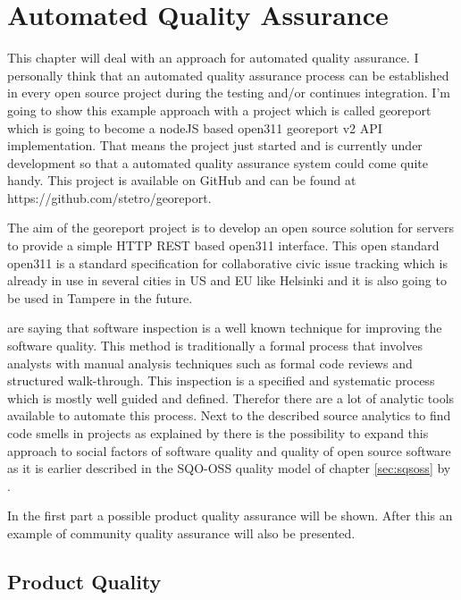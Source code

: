 \documentclass[DIV=calc,paper=a4,fontsize=9pt,twocolumn]{scrartcl}
\begin{document}
\section{Automated Quality Assurance}\label{sec:automated-quality-assurance}

This chapter will deal with an approach for automated quality assurance. I personally think that an automated quality assurance process can be established in every open source project during the testing and/or continues integration. I'm going to show this example approach with a project which is called georeport which is going to become a nodeJS based open311 georeport v2 API implementation. That means the project just started and is currently under development so that a automated quality assurance system could come quite handy. This project is available on GitHub and can be found at https://github.com/stetro/georeport.

The aim of the georeport project is to develop an open source solution for servers to provide a simple HTTP REST based open311 interface. This open standard open311 is a standard specification for collaborative civic issue tracking which is already in use in several cities in US and EU like Helsinki and it is also going to be used in Tampere in the future. \citep{open311}

\citet{van2002java} are saying that software inspection is a well known technique for improving the software quality. This method is traditionally a formal process that involves analysts with manual analysis techniques such as formal code reviews and structured walk-through. This inspection is a specified and systematic process which is mostly well guided and defined. Therefor there are a lot of analytic tools available to automate this process. Next to the described source analytics to find code smells in projects as explained by \citet{van2002java} there is the possibility to expand this approach to social factors of software quality and quality of open source software as it is earlier described in the SQO-OSS quality model of chapter \ref{sec:sqsoss} by \citet{samoladas2008sqo}.

In the first part a possible product quality assurance will be shown. After this an example of community quality assurance will also be presented.

\subsection{Product Quality}
\end{document}
